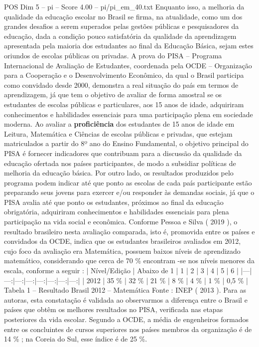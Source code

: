 \begin{textsample}{POS Dim 5 – pi – Score 4.00 – pi/pi\_em\_40.txt}
Enquanto isso, a melhoria da qualidade da educação escolar no Brasil se firma, na atualidade, como um dos grandes desafios a serem superados pelas gestões públicas e pesquisadores da educação, dada a condição pouco satisfatória da qualidade da aprendizagem apresentada pela maioria dos estudantes ao final da Educação Básica, sejam estes oriundos de escolas públicas ou privadas.
A prova do PISA – Programa Internacional de Avaliação de Estudantes, coordenada pela OCDE – Organização para a Cooperação e o Desenvolvimento Econômico, da qual o Brasil participa como convidado desde 2000, demonstra a real situação do país em termos de aprendizagem, já que tem o objetivo de avaliar de forma amostral se os estudantes de escolas públicas e particulares, aos 15 anos de idade, adquiriram conhecimentos e habilidades essenciais para uma participação plena em sociedade moderna.
Ao avaliar a \textbf{proficiência} dos estudantes de 15 anos de idade em Leitura, Matemática e Ciências de escolas públicas e privadas, que estejam matriculados a partir do 8º ano do Ensino Fundamental, o objetivo principal do PISA é fornecer indicadores que contribuam para a discussão da qualidade da educação ofertada nos países participantes, de modo a subsidiar políticas de melhoria da educação básica.
Por outro lado, os resultados produzidos pelo programa podem indicar até que ponto as escolas de cada país participante estão preparando seus jovens para exercer e/ou responder às demandas sociais, já que o PISA avalia até que ponto os estudantes, próximos ao final da educação obrigatória, adquiriram conhecimentos e habilidades essenciais para plena participação na vida social e econômica.
Conforme Pessoa e Silva ( 2019 ), o resultado brasileiro nesta avaliação comparada, isto é, promovida entre os países e convidados da OCDE, indica que os estudantes brasileiros avaliados em 2012, cujo foco da avaliação era Matemática, possuem baixos níveis de aprendizado matemático, considerando que cerca de 70 \% encontram -se nos níveis menores da escala, conforme a seguir : | Nível/Edição | Abaixo de 1 | 1 | 2 | 3 | 4 | 5 | 6 | |---|---:|---:|---:|---:|---:|---:|---:| | 2012 | 35 \% | 32 \% | 21 \% | 8 \% | 4 \% | 1 \% | 0,5 \% | Tabela 1 – Resultado Brasil 2012 – Matemática Fonte : INEP ( 2013 ).
Para as autoras, esta constatação é validada ao observarmos a diferença entre o Brasil e países que obtêm os melhores resultados no PISA, verificada nas etapas posteriores da vida escolar.
Segundo a OCDE, a média de engenheiros formados entre os concluintes de cursos superiores nos países membros da organização é de 14 \% ; na Coreia do Sul, esse índice é de 25 \%.

\end{textsample}
